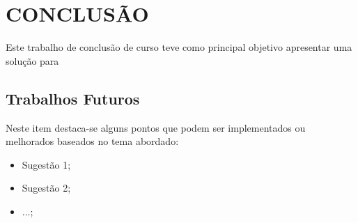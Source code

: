 
\chapter{CONCLUSÃO}
\label{chap:conclusao}

Este trabalho de conclusão de curso teve como principal objetivo apresentar uma solução para 

\section{Trabalhos Futuros}
\label{sec:trabalhosFuturos}

Neste item destaca-se alguns pontos que podem ser implementados ou melhorados baseados no tema abordado:

\begin{itemize}
\item Sugestão 1;
\item Sugestão 2;
\item ...;
\end{itemize}
